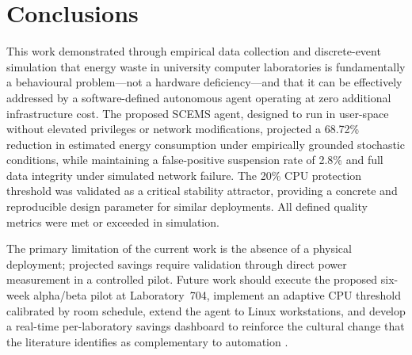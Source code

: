 \documentclass[conference]{IEEEtran}
\begin{document}
\section{Conclusions}

This work demonstrated through empirical data collection and discrete-event simulation that energy waste in university computer laboratories is fundamentally a behavioural problem—not a hardware deficiency—and that it can be effectively addressed by a software-defined autonomous agent operating at zero additional infrastructure cost. The proposed SCEMS agent, designed to run in user-space without elevated privileges or network modifications, projected a 68.72\% reduction in estimated energy consumption under empirically grounded stochastic conditions, while maintaining a false-positive suspension rate of 2.8\% and full data integrity under simulated network failure. The 20\% CPU protection threshold was validated as a critical stability attractor, providing a concrete and reproducible design parameter for similar deployments. All defined quality metrics were met or exceeded in simulation.

The primary limitation of the current work is the absence of a physical deployment; projected savings require validation through direct power measurement in a controlled pilot. Future work should execute the proposed six-week alpha/beta pilot at Laboratory~704, implement an adaptive CPU threshold calibrated by room schedule, extend the agent to Linux workstations, and develop a real-time per-laboratory savings dashboard to reinforce the cultural change that the literature identifies as complementary to automation \cite{bull2018}.


\end{document}
